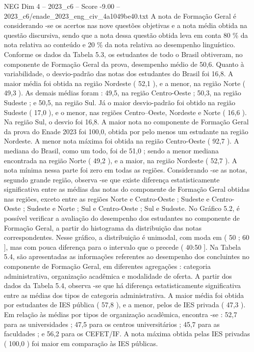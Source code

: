\begin{textsample}{NEG Dim 4 – 2023\_c6 – Score -9.00 – 2023\_c6/enade\_2023\_eng\_civ\_4a1049be40.txt}
A nota de Formação Geral é considerando -se os acertos nas nove questões objetivas e a nota média obtida na questão discursiva, sendo que a nota dessa questão obtida leva em conta 80 \% da nota relativa ao conteúdo e 20 \% da nota relativa ao desempenho linguístico.
Conforme os dados da Tabela 5.3, os estudantes de todo o Brasil obtiveram, no componente de Formação Geral da prova, desempenho médio de 50,6.
Quanto à variabilidade, o desvio-padrão das notas dos estudantes do Brasil foi 16,8.
A maior média foi obtida na região Nordeste ( 52,1 ), e a menor, na região Norte ( 49,3 ).
As demais médias foram : 49,5, na região Centro-Oeste ; 50,3, na região Sudeste ; e 50,5, na região Sul.
Já o maior desvio-padrão foi obtido na região Sudeste ( 17,0 ), e o menor, nas regiões Centro--Oeste, Nordeste e Norte ( 16,6 ).
Na região Sul, o desvio foi 16,8.
A maior nota no componente de Formação Geral da prova do Enade 2023 foi 100,0, obtida por pelo menos um estudante na região Nordeste.
A menor nota máxima foi obtida na região Centro-Oeste ( 92,7 ).
A mediana do Brasil, como um todo, foi de 51,0 ; sendo a menor mediana encontrada na região Norte ( 49,2 ), e a maior, na região Nordeste ( 52,7 ).
A nota mínima nessa parte foi zero em todas as regiões.
Considerando -se as notas, segundo grande região, observa -se que existe diferença estatisticamente significativa entre as médias das notas do componente de Formação Geral obtidas nas regiões, exceto entre as regiões Norte e Centro-Oeste ; Sudeste e Centro-Oeste ; Sudeste e Norte ; Sul e Centro-Oeste ; Sul e Sudeste.
No Gráfico 5.2, é possível verificar a avaliação do desempenho dos estudantes no componente de Formação Geral, a partir do histograma da distribuição das notas correspondentes.
Nesse gráfico, a distribuição é unimodal, com moda em ( 50 ; 60 ], mas com pouca diferença para o intervalo que o precede ( 40:50 ].
Na Tabela 5.4, são apresentadas as informações referentes ao desempenho dos concluintes no componente de Formação Geral, em diferentes agregações : categoria administrativa, organização acadêmica e modalidade de oferta.
A partir dos dados da Tabela 5.4, observa -se que há diferença estatisticamente significativa entre as médias dos tipos de categoria administrativa.
A maior média foi obtida por estudantes de IES pública ( 57,8 ), e a menor, pelos de IES privada ( 47,3 ).
Em relação às médias por tipos de organização acadêmica, encontra -se : 52,7 para as universidades ; 47,5 para os centros universitários ; 45,7 para as faculdades ; e 56,2 para os CEFET/IF.
A nota máxima obtida pelas IES privadas ( 100,0 ) foi maior em comparação às IES públicas.

\end{textsample}
